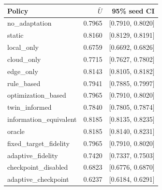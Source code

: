 \begin{tabular}{lrr}
\toprule
Policy & $\bar U$ & 95\% seed CI \\
\midrule
no\_adaptation & 0.7965 & [0.7910, 0.8020] \\
static & 0.8160 & [0.8129, 0.8191] \\
local\_only & 0.6759 & [0.6692, 0.6826] \\
cloud\_only & 0.7715 & [0.7627, 0.7802] \\
edge\_only & 0.8143 & [0.8105, 0.8182] \\
rule\_based & 0.7941 & [0.7885, 0.7997] \\
optimization\_based & 0.7965 & [0.7910, 0.8020] \\
twin\_informed & 0.7840 & [0.7805, 0.7874] \\
information\_equivalent & 0.8185 & [0.8135, 0.8235] \\
oracle & 0.8185 & [0.8140, 0.8231] \\
fixed\_target\_fidelity & 0.7965 & [0.7910, 0.8020] \\
adaptive\_fidelity & 0.7420 & [0.7337, 0.7503] \\
checkpoint\_disabled & 0.6823 & [0.6776, 0.6870] \\
adaptive\_checkpoint & 0.6237 & [0.6184, 0.6291] \\
\bottomrule
\end{tabular}
